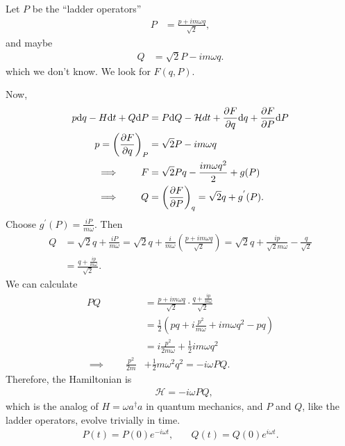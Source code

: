 Let $P$ be the ``ladder operators''
\begin{align}
P & =\frac{p+im\omega q}{\sqrt{2}},
\end{align}
and maybe
\begin{align}
Q &= \sqrt{2} P-im\omega q. 
\end{align}
which we don't know.
We look for $F(q,P)$.

Now, 
\begin{align}
p\mathrm{d} q-H\mathrm{d} t+Q\mathrm{d} P & =P\mathrm{d} Q-\mathcal{H}dt+\frac{\partial F}{\partial q}\mathrm{d} q+\frac{\partial F}{\partial P}\mathrm{d} P\\
p=\left(\frac{\partial F}{\partial q}\right)_{P} & =\sqrt{2}P-im\omega q\\
\implies \qquad F & =\sqrt{2}Pq-\frac{im\omega q^{2}}{2}+g(P)\\
\implies \qquad Q &=\left(\frac{\partial F}{\partial P}\right)_{q}  =\sqrt{2}q+g^{'}(P).
\end{align}
Choose $g^{'}(P)=\frac{iP}{m\omega}$. Then
\begin{align}
Q & =\sqrt{2}q+\frac{iP}{m\omega}=\sqrt{2}q+\frac{i}{m\omega}\left(\frac{p+im\omega q}{\sqrt{2}}\right)=\sqrt{2}q+\frac{ip}{\sqrt{2}m\omega}-\frac{q}{\sqrt{2}}\\
&=\frac{q+\frac{ip}{m\omega}}{\sqrt{2}}.
\end{align}
We can calculate
\begin{align}
PQ &= \frac{p+im\omega q}{\sqrt{2}}\cdot \frac{q+\frac{ip}{m\omega}}{\sqrt{2}}\\
&= \frac{1}{2}\left(pq + i\frac{p^2}{m\omega}+ im\omega q^2 - pq \right)\\
&= i\frac{p^2}{2m\omega}+ \frac{1}{2}im\omega q^2\\
\implies \qquad \frac{p^2}{2m} &+ \frac{1}{2}m\omega^2 q^2  = -i\omega PQ.
\end{align}
Therefore, the Hamiltonian is
\begin{align}
 & \boxed{\mathcal{H}=-i\omega PQ},
\end{align}
which is the analog of $H=\omega a^{\dagger}a$ in quantum mechanics,
and $P$ and $Q$, like the ladder operators, evolve trivially in
time.
\begin{align}
P(t)=P(0)e^{-i\omega t}, \quad & Q(t)=Q(0)e^{i\omega t}.
\end{align}

